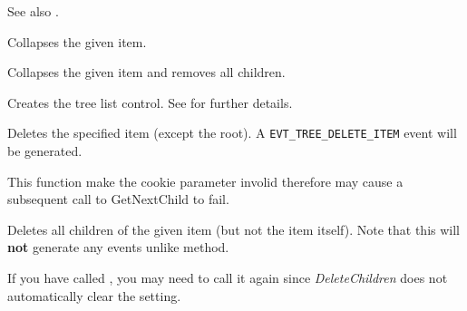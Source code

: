 See also .


\label{wxtreelistctrlcollapse}


Collapses the given item.

\label{wxtreelistctrlcollapseandreset}


Collapses the given item and removes all children.

\label{wxtreelistctrlcreate}


Creates the tree list control. See  for further details.

\label{wxtreelistctrldelete}


Deletes the specified item (except the root). A {\tt EVT\_TREE\_DELETE\_ITEM} event 
will be generated.

This function make the cookie parameter involid therefore may cause a subsequent call 
to GetNextChild to fail.

\label{wxtreelistctrldeletechildren}


Deletes all children of the given item (but not the item itself). Note that
this will {\bf not} generate any events unlike
 method.

If you have called , you
may need to call it again since {\it DeleteChildren} does not automatically
clear the setting.

\label{wxtreelistctrldeleteroot}

